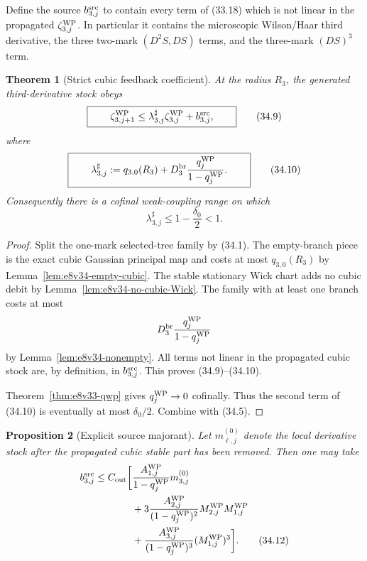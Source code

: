 \documentclass[11pt,oneside]{book}
\newtheorem{theorem}{Theorem}[chapter]
\newtheorem{proposition}[theorem]{Proposition}
\theoremstyle{definition}
\theoremstyle{remark}
\begin{document}
Define the source \(b_{3,j}^{\rm src}\) to contain every term of
(33.18) which is not linear in the propagated
\(\zeta_{3,j}^{\rm WP}\).  In particular it contains the microscopic
Wilson/Haar third derivative, the three two-mark
\((D^2S,DS)\) terms, and the three-mark \((DS)^3\) term.

\begin{theorem}[Strict cubic feedback coefficient]
\label{thm:e8v34-cubic-feedback}
At the radius \(R_3\), the generated third-derivative stock obeys
\[
\boxed{\qquad
 \zeta_{3,j+1}^{\rm WP}
 \leq
 \lambda_{3,j}^{\sharp}\zeta_{3,j}^{\rm WP}
 +b_{3,j}^{\rm src},
\qquad}                                                         \tag{34.9}
\]
where
\[
\boxed{\qquad
 \lambda_{3,j}^{\sharp}
 :=
 q_{3,0}(R_3)
 +D_3^{\rm br}\frac{q_j^{\rm WP}}{1-q_j^{\rm WP}}.
\qquad}                                                         \tag{34.10}
\]
Consequently there is a cofinal weak-coupling range on which
\[
                         \lambda_{3,j}^{\sharp}\leq
                         1-\frac{\delta_0}{2}<1.                 \tag{34.11}
\]
\end{theorem}

\begin{proof}
Split the one-mark selected-tree family by (34.1).  The empty-branch
piece is the exact cubic Gaussian principal map and costs at most
\(q_{3,0}(R_3)\) by
Lemma~\ref{lem:e8v34-empty-cubic}.  The stable stationary Wick chart
adds no cubic debit by
Lemma~\ref{lem:e8v34-no-cubic-Wick}.  The family with at least one
branch costs at most
\[
 D_3^{\rm br}\frac{q_j^{\rm WP}}{1-q_j^{\rm WP}}
\]
by Lemma~\ref{lem:e8v34-nonempty}.  All terms not linear in the
propagated cubic stock are, by definition, in
\(b_{3,j}^{\rm src}\).  This proves (34.9)--(34.10).

Theorem~\ref{thm:e8v33-qwp} gives \(q_j^{\rm WP}\to0\) cofinally.
Thus the second term of (34.10) is eventually at most
\(\delta_0/2\).  Combine with (34.5).
\end{proof}

\begin{proposition}[Explicit source majorant]
\label{prop:e8v34-source}
Let \(m_{\ell,j}^{(0)}\) denote the local derivative stock after the
propagated cubic stable part has been removed.  Then one may take
\[
\begin{split}
 b_{3,j}^{\rm src}\leq C_{\rm out}\bigg[
 &\frac{A_{1,j}^{\rm WP}}{1-q_j^{\rm WP}}m_{3,j}^{(0)}\\
 &+3\frac{A_{2,j}^{\rm WP}}{(1-q_j^{\rm WP})^2}
 M_{2,j}^{\rm WP}M_{1,j}^{\rm WP}\\
 &+\frac{A_{3,j}^{\rm WP}}{(1-q_j^{\rm WP})^3}
 (M_{1,j}^{\rm WP})^3
 \bigg].                                                        \tag{34.12}
\end{split}
\]
\end{proposition}
\end{document}
